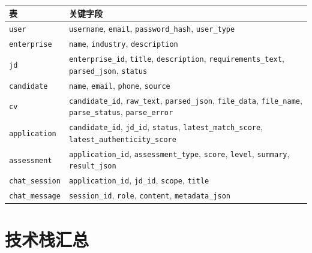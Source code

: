 \documentclass[12pt,a4paper]{ctexart}
\begin{document}
\begin{center}
\renewcommand{\arraystretch}{1.3}
\begin{tabular}{L{2.6cm} L{9.8cm}}
\toprule
\textbf{表} & \textbf{关键字段} \\
\midrule
\texttt{user} & \texttt{username}, \texttt{email}, \texttt{password\_hash}, \texttt{user\_type} \\
\texttt{enterprise} & \texttt{name}, \texttt{industry}, \texttt{description} \\
\texttt{jd} & \texttt{enterprise\_id}, \texttt{title}, \texttt{description}, \texttt{requirements\_text}, \texttt{parsed\_json}, \texttt{status} \\
\texttt{candidate} & \texttt{name}, \texttt{email}, \texttt{phone}, \texttt{source} \\
\texttt{cv} & \texttt{candidate\_id}, \texttt{raw\_text}, \texttt{parsed\_json}, \texttt{file\_data}, \texttt{file\_name}, \texttt{parse\_status}, \texttt{parse\_error} \\
\texttt{application} & \texttt{candidate\_id}, \texttt{jd\_id}, \texttt{status}, \texttt{latest\_match\_score}, \texttt{latest\_authenticity\_score} \\
\texttt{assessment} & \texttt{application\_id}, \texttt{assessment\_type}, \texttt{score}, \texttt{level}, \texttt{summary}, \texttt{result\_json} \\
\texttt{chat\_session} & \texttt{application\_id}, \texttt{jd\_id}, \texttt{scope}, \texttt{title} \\
\texttt{chat\_message} & \texttt{session\_id}, \texttt{role}, \texttt{content}, \texttt{metadata\_json} \\
\bottomrule
\end{tabular}
\end{center}

\section{技术栈汇总}\label{sec:techstack}
\end{document}
